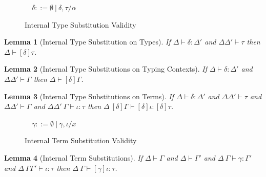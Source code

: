 \documentclass[12pt]{article}
\newtheorem{lemma}{Lemma}
\begin{document}
\begin{figure}[h]
\small\fbox{$\Delta \vdash \delta : \Delta$}~~$\delta ::=  \emptyset ~|~ \delta, \tau/\alpha$
\begin{mathpar}

\end{mathpar}
\caption{Internal Type Substitution Validity}
\label{fig:internal-type-substitution-validity}
\end{figure}

\begin{lemma}[Internal Type Substitution on Types] If $\Delta \vdash \delta : \Delta'$ and $\Delta\Delta' \vdash \tau$ then $\Delta \vdash [\delta]\tau$.\end{lemma}

\begin{lemma}[Internal Type Substitutions on Typing Contexts] If $\Delta \vdash \delta : \Delta'$ and $\Delta\Delta' \vdash \Gamma$ then $\Delta \vdash [\delta]\Gamma$.
\end{lemma}

\begin{lemma}[Internal Type Substitutions on Terms] If $\Delta \vdash \delta : \Delta'$ and $\Delta\Delta' \vdash \tau$ and $\Delta\Delta' \vdash \Gamma$ and $\Delta\Delta'~\Gamma \vdash \iota : \tau$ then $\Delta~[\delta]\Gamma \vdash [\delta]\iota : [\delta]\tau$.
\end{lemma}

\begin{figure}[h]
\small\fbox{$\Delta~\Gamma \vdash \gamma : \Gamma$}~~$\gamma ::= \emptyset ~|~ \gamma, \iota/x$
\begin{mathpar}

\end{mathpar}
\caption{Internal Term Substitution Validity}
\label{fig:internal-term-substitution-validity}
\end{figure}

\begin{lemma}[Internal Term Substitutions] If $\Delta \vdash \Gamma$ and $\Delta \vdash \Gamma'$ and $\Delta~\Gamma \vdash \gamma : \Gamma'$ and $\Delta~\Gamma\Gamma' \vdash \iota : \tau$ then $\Delta~\Gamma \vdash [\gamma]\iota : \tau$.
\end{lemma}
\end{document}
